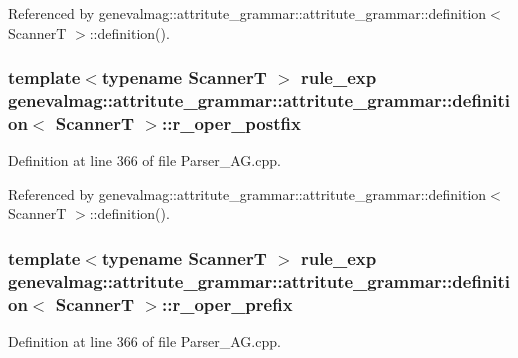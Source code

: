 Referenced by genevalmag::attritute\_\-grammar::attritute\_\-grammar::definition$<$ ScannerT $>$::definition().\hypertarget{structgenevalmag_1_1attritute__grammar_1_1definition_68f97066cd948718d96ca2247e701148}{
\subsubsection[{r\_\-oper\_\-postfix}]{\setlength{\rightskip}{0pt plus 5cm}template$<$typename ScannerT $>$ {\bf rule\_\-exp} genevalmag::attritute\_\-grammar::attritute\_\-grammar::definition$<$ ScannerT $>$::{\bf r\_\-oper\_\-postfix}}}
\label{structgenevalmag_1_1attritute__grammar_1_1definition_68f97066cd948718d96ca2247e701148}




Definition at line 366 of file Parser\_\-AG.cpp.

Referenced by genevalmag::attritute\_\-grammar::attritute\_\-grammar::definition$<$ ScannerT $>$::definition().\hypertarget{structgenevalmag_1_1attritute__grammar_1_1definition_9813aa2f48b89279fdf32fa0a363ed1a}{
\subsubsection[{r\_\-oper\_\-prefix}]{\setlength{\rightskip}{0pt plus 5cm}template$<$typename ScannerT $>$ {\bf rule\_\-exp} genevalmag::attritute\_\-grammar::attritute\_\-grammar::definition$<$ ScannerT $>$::{\bf r\_\-oper\_\-prefix}}}
\label{structgenevalmag_1_1attritute__grammar_1_1definition_9813aa2f48b89279fdf32fa0a363ed1a}




Definition at line 366 of file Parser\_\-AG.cpp.


